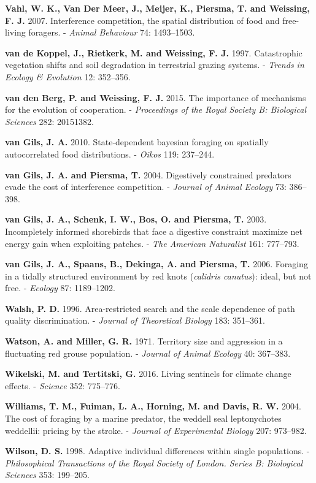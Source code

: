 \documentclass[]{scrartcl}
\begin{document}
\begin{multicols}{2}
\textbf{Vahl, W. K., Van Der Meer, J., Meijer, K., Piersma, T. and
Weissing, F. J.} 2007. Interference competition, the spatial
distribution of food and free-living foragers. - \emph{Animal Behaviour}
74: 1493--1503.

\textbf{van de Koppel, J., Rietkerk, M. and Weissing, F. J.} 1997.
Catastrophic vegetation shifts and soil degradation in terrestrial
grazing systems. - \emph{Trends in Ecology \& Evolution} 12: 352--356.

\textbf{van den Berg, P. and Weissing, F. J.} 2015. The importance of
mechanisms for the evolution of cooperation. - \emph{Proceedings of the
Royal Society B: Biological Sciences} 282: 20151382.

\textbf{van Gils, J. A.} 2010. State-dependent bayesian foraging on
spatially autocorrelated food distributions. - \emph{Oikos} 119:
237--244.

\textbf{van Gils, J. A. and Piersma, T.} 2004. Digestively constrained
predators evade the cost of interference competition. - \emph{Journal of
Animal Ecology} 73: 386--398.

\textbf{van Gils, J. A., Schenk, I. W., Bos, O. and Piersma, T.} 2003.
Incompletely informed shorebirds that face a digestive constraint
maximize net energy gain when exploiting patches. - \emph{The American
Naturalist} 161: 777--793.

\textbf{van Gils, J. A., Spaans, B., Dekinga, A. and Piersma, T.} 2006.
Foraging in a tidally structured environment by red knots
(\emph{calidris canutus}): ideal, but not free. - \emph{Ecology} 87:
1189--1202.

\textbf{Walsh, P. D.} 1996. Area-restricted search and the scale
dependence of path quality discrimination. - \emph{Journal of
Theoretical Biology} 183: 351--361.

\textbf{Watson, A. and Miller, G. R.} 1971. Territory size and
aggression in a fluctuating red grouse population. - \emph{Journal of
Animal Ecology} 40: 367--383.

\textbf{Wikelski, M. and Tertitski, G.} 2016. Living sentinels for
climate change effects. - \emph{Science} 352: 775--776.

\textbf{Williams, T. M., Fuiman, L. A., Horning, M. and Davis, R. W.}
2004. The cost of foraging by a marine predator, the weddell seal
leptonychotes weddellii: pricing by the stroke. - \emph{Journal of
Experimental Biology} 207: 973--982.

\textbf{Wilson, D. S.} 1998. Adaptive individual differences within
single populations. - \emph{Philosophical Transactions of the Royal
Society of London. Series B: Biological Sciences} 353: 199--205.


\end{multicols}
\end{document}

